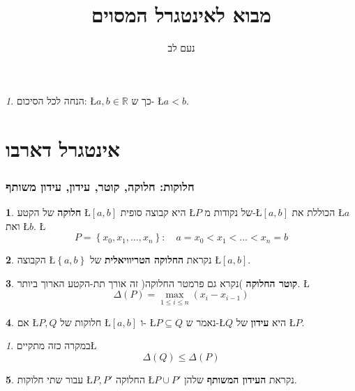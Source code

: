 \documentclass[english,hebrew]{article}
\theoremstyle{remark}
\newtheorem*{rem*}{\protect\remarkname}
\theoremstyle{definition}
\newtheorem*{defn*}{\protect\definitionname}
\theoremstyle{plain}
\theoremstyle{remark}
\newtheorem{claim}[thm]{\protect\claimname}
\theoremstyle{plain}
\theoremstyle{plain}
\providecommand{\claimname}{טענה}
\providecommand{\definitionname}{הגדרה}
\providecommand{\remarkname}{הערה}
\begin{document}
\title{מבוא לאינטגרל המסוים}
\author{נעם לב}

\maketitle
\tableofcontents{}

\newpage{}
\begin{rem*}
הנחה לכל הסיכום: \L{$a,b\in\mathbb{R}$} כך ש- \L{$a<b$}.
\end{rem*}

\part{אינטגרל דארבו}

\section{חלוקות: חלוקה, קוטר, עידון, עידון משותף}
\begin{defn*}
\textbf{חלוקה} של הקטע \L{$\left[a,b\right]$} היא קבוצה סופית \L{$P$}
של נקודות מ-\L{$\left[a,b\right]$} הכוללת את \L{$a$} ואת \L{$b$}.
\L{%
\[
P=\left\{ x_{0},x_{1},\dots,x_{n}\right\} :\quad a=x_{0}<x_{1}<\dots<x_{n}=b
\]
}%
\end{defn*}
\begin{defn*}
הקבוצה \L{$\left\{ a,b\right\} $} נקראת \textbf{החלוקה הטריוויאלית
}של \L{$\left[a,b\right]$}.
\end{defn*}
\begin{defn*}
\textbf{קוטר החלוקה })נקרא גם פרמטר החלוקה( זה אורך תת-הקטע הארוך
ביותר. \L{%
\[
\Delta\left(P\right)=\underset{1\le i\le n}{\max}\left(x_{i}-x_{i-1}\right)
\]
}%
\end{defn*}
\begin{defn*}
אם \L{$P,Q$} חלוקות של \L{$\left[a,b\right]$} ו- \L{$P\subseteq Q$}
נאמר ש-\L{$Q$} היא \textbf{עידון} של \L{$P$}.
\end{defn*}
\begin{claim}
במקרה כזה מתקיים\L{%
\[
\Delta\left(Q\right)\le\Delta\left(P\right)
\]
}%
\end{claim}

\begin{defn*}
עבור שתי חלוקות \L{$P,P'$} החלוקה \L{$P\cup P'$} נקראת \textbf{העידון
המשותף} שלהן.
\end{defn*}
\end{document}
